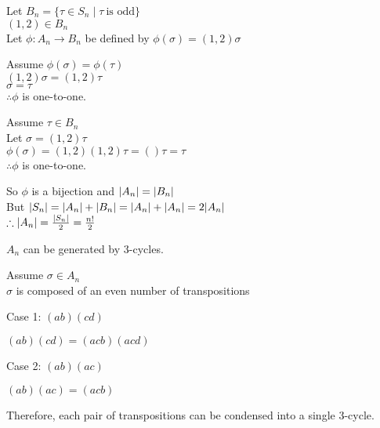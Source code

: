\documentclass[letterpaper,12pt,fleqn]{article}
\renewcommand{\o}{\sigma}
\renewcommand{\t}{\tau}
\newcommand{\p}{\phi}
\begin{document}
\begin{theproof}
  Let $B_n=\{\t\in S_n\mid\t\ \mbox{is odd}\}$ \\
  $(1,2)\in B_n$ \\
  Let $\p:A_n\to B_n$ be defined by $\p(\o)=(1,2)\o$

  Assume $\p(\o)=\p(\t)$ \\
  $(1,2)\o=(1,2)\t$ \\
  $\o=\t$ \\
  $\therefore \p$ is one-to-one.

  Assume $\t\in B_n$ \\
  Let $\o=(1,2)\t$ \\
  $\p(\o)=(1,2)(1,2)\t=()\t=\t$ \\
  $\therefore \p$ is one-to-one.

  So $\p$ is a bijection and $\lvert A_n\rvert=\lvert B_n\rvert$ \\
  But $\lvert S_n\rvert=\lvert A_n\rvert+\lvert B_n\rvert=\lvert A_n\rvert+\lvert A_n\rvert=2\lvert A_n\rvert$ \\
  $\therefore \lvert A_n\rvert=\frac{\lvert S_n\rvert}{2}=\frac{n!}{2}$
\end{theproof}

\begin{theorem}
  $A_n$ can be generated by 3-cycles.
\end{theorem}

\begin{theproof}
  Assume $\o\in A_n$ \\
  $\o$ is composed of an even number of transpositions \\
  \begin{description}
  \item Case 1: $(ab)(cd)$

    $(ab)(cd)=(acb)(acd)$

  \item Case 2: $(ab)(ac)$

    $(ab)(ac)=(acb)$
  \end{description}

  Therefore, each pair of transpositions can be condensed into a single
  3-cycle.
\end{theproof}
\end{document}
